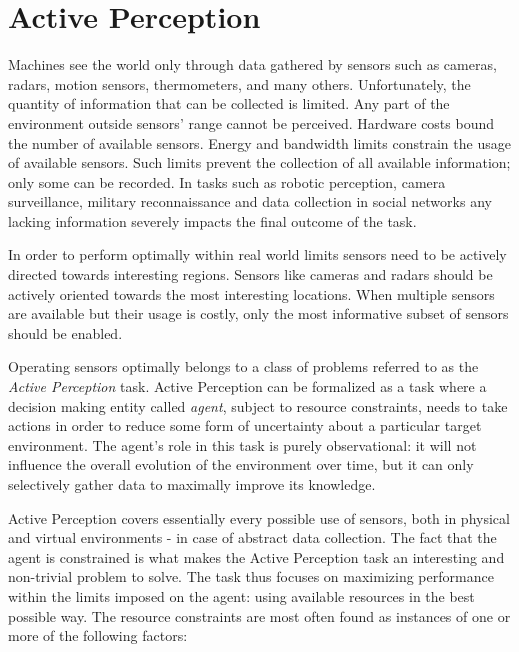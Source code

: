 \section{Active Perception}

Machines see the world only through data gathered by sensors such as cameras, radars, motion
sensors, thermometers, and many others. Unfortunately, the quantity of information that can be
collected is limited. Any part of the environment outside sensors' range cannot be perceived.
Hardware costs bound the number of available sensors. Energy and bandwidth limits constrain the
usage of available sensors. Such limits prevent the collection of all available information; only
some can be recorded. In tasks such as robotic perception, camera surveillance, military
reconnaissance and data collection in social networks any lacking information severely impacts the
final outcome of the task.

In order to perform optimally within real world limits sensors need to be actively directed towards
interesting regions. Sensors like cameras and radars should be actively oriented towards the most
interesting locations. When multiple sensors are available but their usage is costly, only the most
informative subset of sensors should be enabled.

Operating sensors optimally belongs to a class of problems referred to as the \textit{Active
Perception} task.  Active Perception can be formalized as a task where a decision making entity
called \textit{agent}, subject to resource constraints, needs to take actions in order to reduce
some form of uncertainty about a particular target environment. The agent's role in this task is
purely observational: it will not influence the overall evolution of the environment over time, but
it can only selectively gather data to maximally improve its knowledge.

Active Perception covers essentially every possible use of sensors, both in physical and virtual
environments - in case of abstract data collection. The fact that the agent is constrained is what
makes the Active Perception task an interesting and non-trivial problem to solve. The task thus
focuses on maximizing performance within the limits imposed on the agent: using available resources
in the best possible way. The resource constraints are most often found as instances of one or more
of the following factors:

